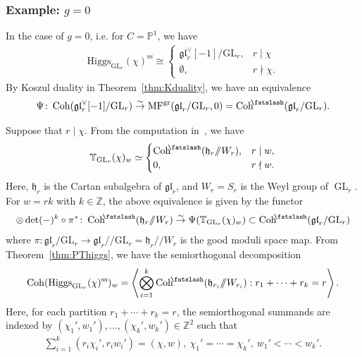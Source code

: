\documentclass [11pt,oneside,a4paper,mathscr]{amsart}
\theoremstyle{definition}
\newcommand{\Coh}{\operatorname{Coh}}
\newcommand{\GL}{\operatorname{GL}}
\newcommand{\shear}{{\mathbin{\mkern-6mu\fatslash}}}
\newcommand{\ssslash}{/\!\!/}
\newcommand{\Hig}{\mathrm{Higgs}}
\begin{document}
\subsubsection{Example: $g=0$}\label{subsubsec:g=0}
In the case of $g=0$, i.e. for $C=\mathbb{P}^1$, 
we have 
\begin{align*}
    \Hig_{\GL_r}(\chi)^{\mathrm{ss}} \cong \begin{cases}
\mathfrak{gl}_r^{\vee}[-1]/\mathrm{GL}_r, & r\mid \chi \\
\emptyset, & r \nmid \chi. 
    \end{cases}
\end{align*}
By Koszul duality in Theorem~\ref{thm:Kduality}, we have an equivalence 
\begin{align*}
\Psi \colon 
    \Coh(\mathfrak{gl}_r^{\vee}[-1]/\mathrm{GL}_r) \stackrel{\sim}{\to}
    \mathrm{MF}^{\mathrm{gr}}(\mathfrak{gl}_r/\mathrm{GL}_r, 0)=\Coh^{\shear}(\mathfrak{gl}_r/\mathrm{GL}_r). 
\end{align*}

Suppose that $r\mid \chi$. 
From the computation in~\cite[Lemma~3.3]{Toquot2}, we have 
\begin{align}\label{qbps:g=0}
    \mathbb{T}_{\mathrm{GL}_r}(\chi)_w \simeq \begin{cases}
        \Coh^{\shear}(\mathfrak{h}_r\ssslash W_r),& r\mid w, \\
         0, & r\nmid w.
    \end{cases}
\end{align}
Here, $\mathfrak{h}_r$ is the Cartan subalgebra of $\mathfrak{gl}_r$, and $W_r=S_r$ is the Weyl group of $\GL_r$.
For $w=rk$ with $k\in \mathbb{Z}$, the above equivalence is given by 
the functor
\begin{align*}
\otimes \det(-)^k \circ \pi^{\ast} \colon
    \Coh^{\shear}(\mathfrak{h}_r\ssslash W_r) \stackrel{\sim}{\to} \Psi(\mathbb{T}_{\GL_r}(\chi)_w) \subset \Coh^{\shear}(\mathfrak{gl}_r/\mathrm{GL}_r)
\end{align*}
where $\pi \colon \mathfrak{gl}_r/\mathrm{GL}_r \to \mathfrak{gl}_r \ssslash \mathrm{GL}_r=\mathfrak{h}_r\ssslash W_r$ is the good moduli space map. From Theorem~\ref{thm:PThiggs}, we have the semiorthogonal decomposition 
\begin{align*}
    \Coh(\Hig_{\GL_r}(\chi)^{\mathrm{ss}})_w
    =\left\langle \bigotimes_{i=1}^k \Coh^{\shear}(\mathfrak{h}_{r_i} \ssslash W_{r_i}) : r_1+\cdots+r_k=r\right\rangle.
\end{align*}
Here, for each partition $r_1+\cdots+r_k=r$, the semiorthogonal summands are indexed by 
$(\chi_1', w_1'), \ldots, (\chi_k', w_k') \in \mathbb{Z}^2$ such that 
\begin{align*}
    \sum_{i=1}^k (r_i \chi_i', r_i w_i')=(\chi, w), \ 
    \chi_1'=\cdots=\chi_k', \ w_1'<\cdots<w_k'. 
\end{align*}
\end{document}
